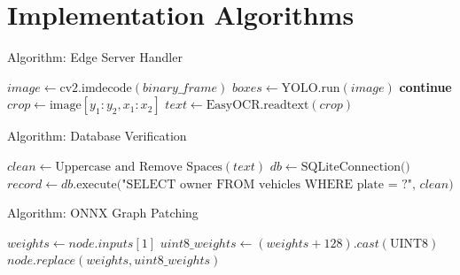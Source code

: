 \documentclass{beamer}
\begin{document}
\section{Implementation Algorithms}

\begin{frame}{Algorithm: Edge Server Handler}
\begin{algorithm}[H]
\caption{WebSocket Connection Handler}
\begin{algorithmic}[1]
\State $image \gets \text{cv2.imdecode}(binary\_frame)$
\State $boxes \gets \text{YOLO.run}(image)$
     
        \State \textbf{continue}
    \EndIf
    \State $crop \gets \text{image}[y_1:y_2, x_1:x_2]$
    \State $text \gets \text{EasyOCR.readtext}(crop)$
    \State {}
\EndFor
\end{algorithmic}
\end{algorithm}
\end{frame}

\begin{frame}{Algorithm: Database Verification}
\begin{algorithm}[H]
\caption{Validate and Verify License Plate}
\begin{algorithmic}[1]
    \State $clean \gets \text{Uppercase and Remove Spaces}(text)$
        \State $db \gets \text{SQLiteConnection()}$
        \State $record \gets db.\text{execute("SELECT owner FROM vehicles WHERE plate = ?", } clean)$
            \State \Return {}
        \EndIf
    \EndIf
    \State \Return {}
\EndFunction
\end{algorithmic}
\end{algorithm}
\end{frame}

\begin{frame}{Algorithm: ONNX Graph Patching}
\begin{algorithm}[H]
\caption{Fix ConvInteger INT8 for ARM CPUs}
\begin{algorithmic}[1]
        \State $weights \gets node.inputs[1]$
            \State $uint8\_weights \gets (weights + 128).cast(\text{UINT8})$
            \State $node.replace(weights, uint8\_weights)$
        \EndIf
    \EndIf
\EndFor
\end{algorithmic}
\end{algorithm}
\end{frame}
\end{document}
